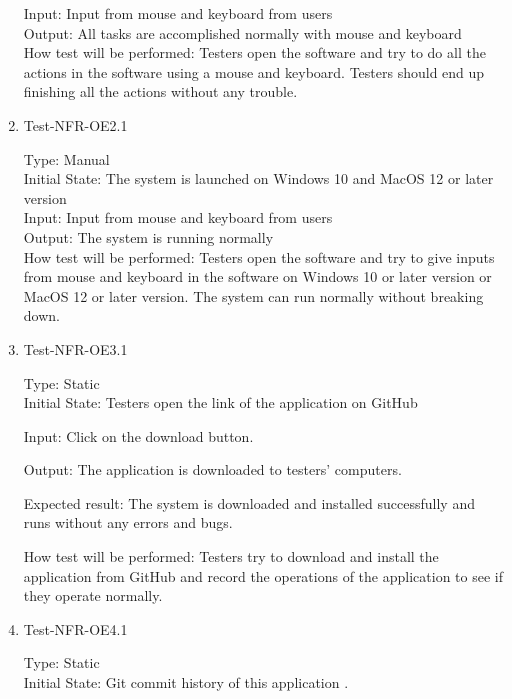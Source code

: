 \documentclass[12pt, titlepage]{article}
\begin{document}
\begin{enumerate}
Input: Input from mouse and keyboard from users\\

Output: All tasks are accomplished normally with mouse and keyboard\\

How test will be performed: Testers open the software and try to do all the actions in the software using a mouse and keyboard. Testers should end up finishing all the actions without any trouble.

\item{Test-NFR-OE2.1\\}

Type: Manual\\

Initial State: The system is launched on Windows 10 and MacOS 12 or later version\\

Input:  Input from mouse and keyboard from users\\

Output: The system is running normally\\

How test will be performed: Testers open the software and try to give inputs from mouse and keyboard in the software on Windows 10 or later version or MacOS 12 or later version. The system can run normally without breaking down.

\item{Test-NFR-OE3.1\\}

Type: Static\\

Initial State: Testers open the link of the application on GitHub

Input: Click on the download button.

Output: The application is downloaded to testers' computers.

Expected result: The system is downloaded and installed successfully and runs without any errors and bugs.

How test will be performed: Testers try to download and install the application from GitHub and record the operations of the application to see if they operate normally.

\item{Test-NFR-OE4.1\\}

Type: Static\\

Initial State: Git commit history of this application .\\


\end{enumerate}
\end{document}
